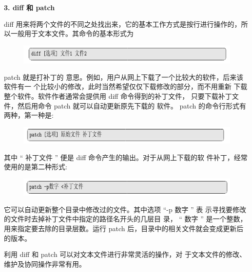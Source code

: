 \documentclass[12pt，a4paper]{article}
\numberwithin{equation}{section}
\begin{document}
\textbf{3. diff 和 patch}

diff 用来将两个文件的不同之处找出来，它的基本工作方式是按行进行操作的，所以一般用于文本文件。其命令的基本形式为
\begin{figure}[H]
\centering
\includegraphics[scale=0.6]{./figures/270.png}
\end{figure}

patch 就是打补丁的
意思。例如，用户从网上下载了一个比较大的软件，后来该软件有一
个比较小的修改，此时当然希望仅仅下载修改的部分，而不用重新
下载整个软件。软件作者通常会提供用 diff 命令得到的补丁文件，
只要下载补丁文件，然后用命令 patch 就可以自动更新原先下载的
软件。 patch 的命令行形式有两种，第一种是:
\begin{figure}[H]
\centering
\includegraphics[scale=0.6]{./figures/271.png}
\end{figure}
其中 “ 补丁文件 ” 便是 diff 命令产生的输出。对于从网上下载的软
件补丁，经常使用的是第二种形式:

\begin{figure}[H]
\centering
\includegraphics[scale=0.6]{./figures/272.png}
\end{figure}
它可以自动更新整个目录中修改过的文件。其中选项 “-p 数字 ” 表
示寻找要修改的文件时去掉补丁文件中指定的路径名开头的几层目
录， “ 数字 ” 是一个整数，用来指定要去除的目录层数。运行 patch
后，目录中的相关文件就会变成更新后的版本。

利用 diff 和 patch 可以对文本文件进行非常灵活的操作，对
于文本文件的修改、维护及协同操作非常有用。

\cite{tam19912d}

%
\end{document}
